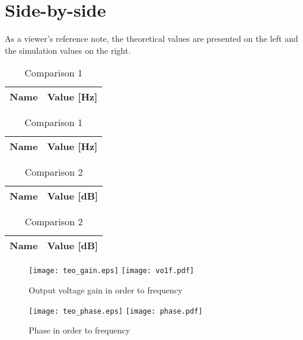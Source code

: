 \section{Side-by-side}
\label{sec:sbs}

As a viewer's reference note, the theoretical values are presented on the left and the simulation values on the right.

\begin{table}[h]
\begin{center}
  \begin{tabular}{|c|c|}
    \hline    
    {\bf Name} & {\bf Value [Hz]} \\ \hline
    
    \hline
  \end{tabular}
  \begin{tabular}{|c||c|}
    \hline    
    {\bf Name} & {\bf Value [Hz]} \\ \hline
    
    \hline
  \end{tabular}
  \caption{Comparison 1}
  \label{tab:comparison 1}
\end{center}
\end{table}
\FloatBarrier

\begin{table}[h]
\begin{center}
  \begin{tabular}{|c|c|}
    \hline    
    {\bf Name} & {\bf Value [dB]} \\ \hline
    
    \hline
  \end{tabular}
  \begin{tabular}{|c||c|}
    \hline    
    {\bf Name} & {\bf Value [dB]} \\ \hline
    
    \hline
  \end{tabular}
  \caption{Comparison 2}
  \label{tab:comparison 2}
\end{center}
\end{table}
\FloatBarrier

\begin{figure}[h] \centering
\texttt{[image: teo\_gain.eps]}
\texttt{[image: vo1f.pdf]}
\caption{Output voltage gain in order to frequency}
\label{fig:comparison 3}
\end{figure}
\FloatBarrier

\begin{figure}[h] \centering
\texttt{[image: teo\_phase.eps]}
\texttt{[image: phase.pdf]}
\caption{Phase in order to frequency}
\label{fig:comparison 4}
\end{figure}
\FloatBarrier

